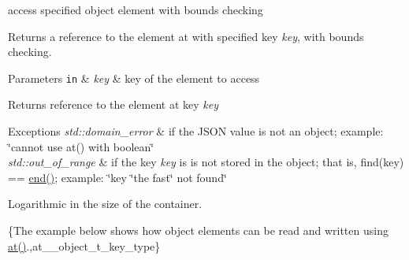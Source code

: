 access specified object element with bounds checking 

Returns a reference to the element at with specified key {\itshape key}, with bounds checking.


\begin{DoxyParams}[1]{Parameters}
\mbox{\tt in}  & {\em key} & key of the element to access\\
\hline
\end{DoxyParams}
\begin{DoxyReturn}{Returns}
reference to the element at key {\itshape key} 
\end{DoxyReturn}

\begin{DoxyExceptions}{Exceptions}
{\em std\-::domain\-\_\-error} & if the J\-S\-O\-N value is not an object; example\-: {\ttfamily \char`\"{}cannot use at() with boolean\char`\"{}} \\
\hline
{\em std\-::out\-\_\-of\-\_\-range} & if the key {\itshape key} is is not stored in the object; that is, {\ttfamily find(key) == \hyperlink{classnlohmann_1_1basic__json_a12ccf14d39ddae52f6c7e126105a230b}{end()}}; example\-: {\ttfamily \char`\"{}key \char`\"{}the fast\char`\"{} not found\char`\"{}}\\
\hline
\end{DoxyExceptions}
Logarithmic in the size of the container.

\{The example below shows how object elements can be read and written using {\ttfamily \hyperlink{classnlohmann_1_1basic__json_a214a8c22d616fd3567b88932c07436c9}{at()}}.,at\-\_\-\-\_\-object\-\_\-t\-\_\-key\-\_\-type\}

